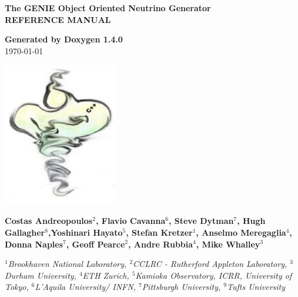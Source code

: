 \documentclass[a4paper]{book}
\begin{document}
\begin{titlepage}
\vspace*{3cm}
\begin{center}

{\Large \textbf{The GENIE Object Oriented Neutrino Generator}}\\
\vspace*{1cm}
{\Large \textbf{REFERENCE MANUAL}}\\
\vspace*{1cm}

{\large \textbf{Generated by Doxygen 1.4.0}}\\
\vspace*{0.5cm}
{\large \today}\\
\vspace*{1cm}

\includegraphics[width=5cm,keepaspectratio]{../../data/logo/genie_logo.eps}

\vspace*{0.6cm}

{\textbf{Costas Andreopoulos$^{2}$, Flavio Cavanna$^{6}$, Steve Dytman$^{7}$,
Hugh Gallagher$^{8}$,Yoshinari Hayato$^{5}$, Stefan Kretzer$^{1}$, Anselmo Meregaglia$^{4}$,
Donna Naples$^{7}$, Geoff Pearce$^{2}$, Andre Rubbia$^{4}$, Mike Whalley$^{3}$}}\\
\vspace*{0.5cm}

{\textit{
$^{1}$Brookhaven National Laboratory, 
$^{2}$CCLRC - Rutherford Appleton Laboratory,
$^{3}$Durham University, 
$^{4}$ETH Zurich, 
$^{5}$Kamioka Observatory, ICRR, University of Tokyo, 
$^{6}$L'Aquila University/ INFN, 
$^{7}$Pittsburgh University, $^{9}$Tufts University}}

\end{center}
\end{titlepage}
\clearemptydoublepage
{}
\tableofcontents
\clearemptydoublepage
{}
\end{document}
